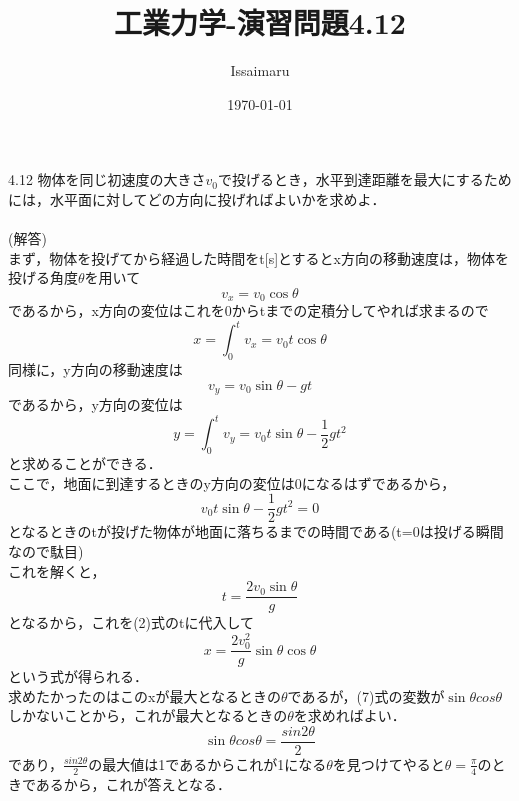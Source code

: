 \documentclass[a4paper,11pt]{jsarticle}
\begin{document}
\title{工業力学-演習問題4.12}
\author{Issaimaru}
\date{\today}
  \maketitle

  4.12 物体を同じ初速度の大きさ$v_{0}$で投げるとき，水平到達距離を最大にするためには，水平面に対してどの方向に投げればよいかを求めよ．
  \\
  \\
  (解答)\\
  まず，物体を投げてから経過した時間をt[s]とするとx方向の移動速度は，物体を投げる角度$\theta$を用いて
  \begin{equation}
    v_{x}=v_{0}\cos{\theta}
  \end{equation}
  であるから，x方向の変位はこれを0からtまでの定積分してやれば求まるので
  \begin{equation}
    x=\int_{0}^{t}v_{x}=v_{0}t\cos{\theta}
  \end{equation}
  同様に，y方向の移動速度は
  \begin{equation}
    v_{y}=v_{0}\sin{\theta}-gt
  \end{equation}
  であるから，y方向の変位は
  \begin{equation}
    y=\int_{0}^{t}v_{y}=v_{0}t\sin{\theta}-\frac{1}{2}gt^2
  \end{equation}
  と求めることができる．\\
  ここで，地面に到達するときのy方向の変位は0になるはずであるから，
  \begin{equation}
    v_{0}t\sin{\theta}-\frac{1}{2}gt^2=0
  \end{equation}
  となるときのtが投げた物体が地面に落ちるまでの時間である(t=0は投げる瞬間なので駄目)\\
  これを解くと，
  \begin{equation}
    t=\frac{2v_{0}\sin{\theta}}{g}
  \end{equation}
  となるから，これを(2)式のtに代入して
  \begin{equation}
    x=\frac{2v_{0}^2}{g}\sin{\theta}\cos{\theta}
  \end{equation}
  という式が得られる．\\
  求めたかったのはこのxが最大となるときの$\theta$であるが，(7)式の変数が$\sin{\theta}cos{\theta}$しかないことから，これが最大となるときの$\theta$を求めればよい．\\
  \begin{equation}
    \sin{\theta}cos{\theta}=\frac{sin{2\theta}}{2}
  \end{equation}
  であり，$\frac{sin{2\theta}}{2}$の最大値は1であるからこれが1になる$\theta$を見つけてやると$\theta=\frac{\pi}{4}$のときであるから，これが答えとなる．
\end{document}
